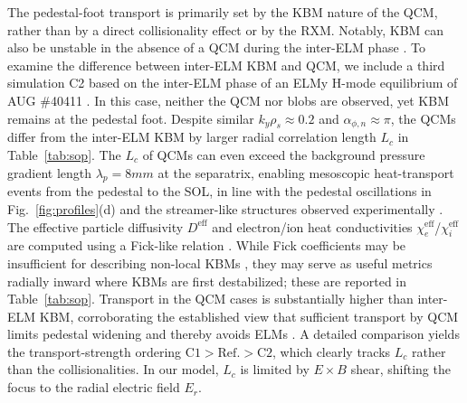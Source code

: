 \documentclass[aps,prl,twocolumn,superscriptaddress]{revtex4-2}
\begin{document}
{The pedestal-foot transport is primarily set by the KBM nature of the QCM, rather than by a direct collisionality effect or by the RXM.}
Notably, KBM can also be unstable in the absence of a QCM during the inter-ELM phase \cite{zholobenko2024tokamak,snyder2011first,Dickinson2012}.
To examine the difference between inter-ELM KBM and QCM, we include a third simulation C2 based on the inter-ELM phase of an ELMy H-mode equilibrium of AUG \#40411 \cite{zholobenko2024tokamak}.
In this case, neither the QCM nor blobs are observed, yet KBM remains at the pedestal foot.
Despite similar $k_y\rho_s\approx 0.2$ and $\alpha_{\phi,n}\approx \pi$, the QCMs differ from the inter-ELM KBM by larger radial correlation length $L_c$ \cite{wessonTokamaks2011} in Table~\ref{tab:sop}.
The $L_c$ of QCMs can even exceed the background pressure gradient length $\lambda_p= 8 \si{mm}$ at the separatrix, enabling mesoscopic heat-transport events from the pedestal to the SOL, in line with the pedestal oscillations in Fig.~\ref{fig:profiles}(d) and the streamer-like structures observed experimentally \cite{kalis2023experimental,grienerContinuousObservationFilaments2020,harrerQuasicontinuousExhaustScenario2022}.
The effective particle diffusivity $D^{\mathrm{eff}}$ and electron/ion heat conductivities $\chi_e^{\mathrm{eff}}$/$\chi_i^{\mathrm{eff}}$ are computed using a Fick-like relation \cite{callen2010analysis}.
While Fick coefficients may be insufficient for describing non-local KBMs \cite{hahm2018mesoscopic,ashourvan2016mesoscopic}, they may serve as useful metrics radially inward where KBMs are first destabilized; these are reported in Table~\ref{tab:sop}.
Transport in the QCM cases is substantially higher than inter-ELM KBM, corroborating the established view that sufficient transport by QCM limits pedestal widening and thereby avoids ELMs \cite{harrerParameterDependencesSmall2018,dunne2024quasi,snyder2011first}.
{A detailed comparison yields the transport-strength ordering $\mathrm{C1}>\mathrm{Ref.}>\mathrm{C2}$, which clearly tracks $L_c$ rather than the collisionalities.}
In our model, $L_c$ is limited by $E\times B$ shear, shifting the focus to the radial electric field $E_r$.
\end{document}
